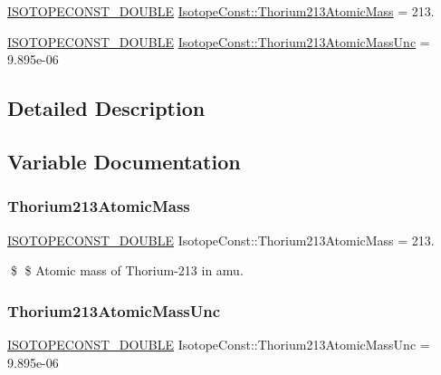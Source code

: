 \begin{DoxyCompactItemize}
\item 
\mbox{\hyperlink{group___isotope_const-_macros_ga8f45a7272ce02c0b4c65c44636ed719a}{I\+S\+O\+T\+O\+P\+E\+C\+O\+N\+S\+T\+\_\+\+D\+O\+U\+B\+LE}} \mbox{\hyperlink{group___isotope_const-_thorium-_th213_gaf7240ec971774f11800325a6f30ff580}{Isotope\+Const\+::\+Thorium213\+Atomic\+Mass}} = 213.
\item 
\mbox{\hyperlink{group___isotope_const-_macros_ga8f45a7272ce02c0b4c65c44636ed719a}{I\+S\+O\+T\+O\+P\+E\+C\+O\+N\+S\+T\+\_\+\+D\+O\+U\+B\+LE}} \mbox{\hyperlink{group___isotope_const-_thorium-_th213_ga1693a5dac52240be8fbf9a40899d042f}{Isotope\+Const\+::\+Thorium213\+Atomic\+Mass\+Unc}} = 9.\+895e-\/06
\end{DoxyCompactItemize}


\subsection{Detailed Description}


\subsection{Variable Documentation}
\mbox{\label{group___isotope_const-_thorium-_th213_gaf7240ec971774f11800325a6f30ff580}} 
\subsubsection{\texorpdfstring{Thorium213\+Atomic\+Mass}{Thorium213AtomicMass}}
{\footnotesize\ttfamily \mbox{\hyperlink{group___isotope_const-_macros_ga8f45a7272ce02c0b4c65c44636ed719a}{I\+S\+O\+T\+O\+P\+E\+C\+O\+N\+S\+T\+\_\+\+D\+O\+U\+B\+LE}} Isotope\+Const\+::\+Thorium213\+Atomic\+Mass = 213.}

\$ \$ Atomic mass of Thorium-\/213 in amu. \mbox{\label{group___isotope_const-_thorium-_th213_ga1693a5dac52240be8fbf9a40899d042f}} 
\subsubsection{\texorpdfstring{Thorium213\+Atomic\+Mass\+Unc}{Thorium213AtomicMassUnc}}
{\footnotesize\ttfamily \mbox{\hyperlink{group___isotope_const-_macros_ga8f45a7272ce02c0b4c65c44636ed719a}{I\+S\+O\+T\+O\+P\+E\+C\+O\+N\+S\+T\+\_\+\+D\+O\+U\+B\+LE}} Isotope\+Const\+::\+Thorium213\+Atomic\+Mass\+Unc = 9.\+895e-\/06}

